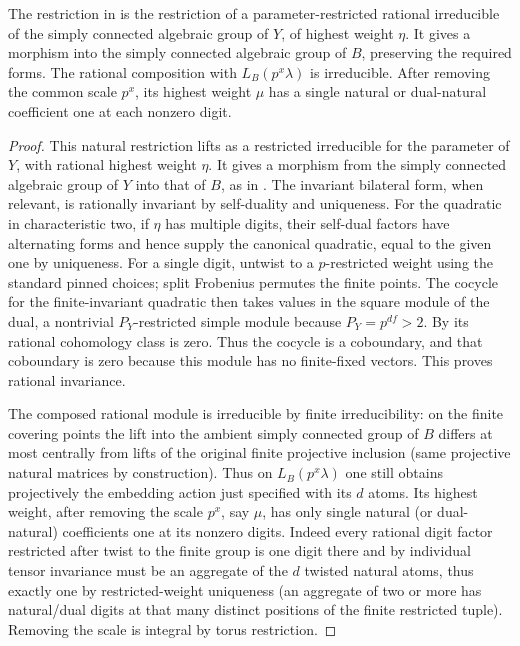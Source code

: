 \begin{lemma}
\label{fb:rational-lift}
The restriction in  is the restriction of a
parameter-restricted rational irreducible of the simply connected algebraic
group of \(Y\), of highest weight \(\eta\).  It gives a morphism into the
simply connected algebraic group of \(B\), preserving the required forms.
The rational composition with \(L_B(p^x\lambda)\) is irreducible.  After
removing the common scale \(p^x\), its highest weight \(\mu\) has a
single natural or dual-natural coefficient one at each nonzero digit.
\end{lemma}
\begin{proof}

This natural restriction lifts as a restricted irreducible for the parameter
of \(Y\), with rational highest weight \(\eta\). It gives a morphism
from the simply connected algebraic group of \(Y\) into that of \(B\),
as in . The invariant bilateral form,
when relevant, is rationally invariant by self-duality and uniqueness.
For the quadratic in characteristic two, if \(\eta\) has multiple
digits, their self-dual factors have alternating forms and hence supply
the canonical quadratic, equal to the given one by uniqueness.
For a single digit, untwist to a \(p\)-restricted weight using the
standard pinned choices; split Frobenius permutes the finite points.
The cocycle for the finite-invariant quadratic then takes values in
the square module of the dual, a nontrivial \(P_Y\)-restricted simple
module because \(P_Y=p^{df}>2\). By  its rational
cohomology class is zero. Thus the cocycle is a coboundary, and that
coboundary is zero because this module has no finite-fixed vectors.
This proves rational invariance.

The composed rational module is irreducible by finite irreducibility: on the finite covering points the lift into the ambient simply connected group of \(B\) differs at most centrally from lifts of the original finite projective inclusion (same projective natural matrices by construction). Thus on \(L_B(p^x\lambda)\) one still obtains projectively the embedding action just specified with its \(d\) atoms. Its highest weight, after removing the scale \(p^x\), say \(\mu\), has only single natural (or dual-natural) coefficients one at its nonzero digits. Indeed every rational digit factor restricted after twist to the finite group is one digit there and by individual tensor invariance must be an aggregate of the \(d\) twisted natural atoms, thus exactly one by restricted-weight uniqueness (an aggregate of two or more has natural/dual digits at that many distinct positions of the finite restricted tuple). Removing the scale is integral by torus restriction.
\end{proof}

